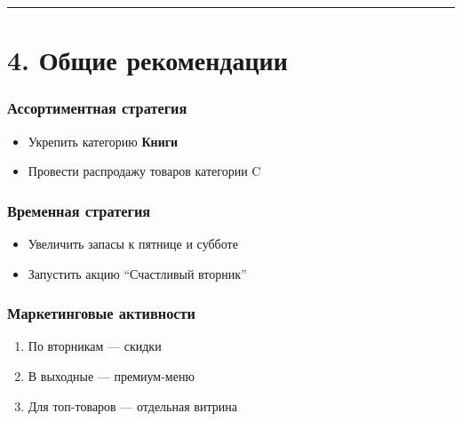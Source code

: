 \documentclass[
]{article}
\providecommand{\tightlist}{%
  \setlength{\itemsep}{0pt}\setlength{\parskip}{0pt}}
\begin{document}
\begin{center}\rule{0.5\linewidth}{0.5pt}\end{center}

\section{4. Общие
рекомендации}\label{ux43eux431ux449ux438ux435-ux440ux435ux43aux43eux43cux435ux43dux434ux430ux446ux438ux438}

\subsubsection{Ассортиментная
стратегия}\label{ux430ux441ux441ux43eux440ux442ux438ux43cux435ux43dux442ux43dux430ux44f-ux441ux442ux440ux430ux442ux435ux433ux438ux44f}

\begin{itemize}
\tightlist
\item
  Укрепить категорию \textbf{Книги}
\item
  Провести распродажу товаров категории C
\end{itemize}

\subsubsection{Временная
стратегия}\label{ux432ux440ux435ux43cux435ux43dux43dux430ux44f-ux441ux442ux440ux430ux442ux435ux433ux438ux44f}

\begin{itemize}
\tightlist
\item
  Увеличить запасы к пятнице и субботе
\item
  Запустить акцию ``Счастливый вторник''
\end{itemize}

\subsubsection{Маркетинговые
активности}\label{ux43cux430ux440ux43aux435ux442ux438ux43dux433ux43eux432ux44bux435-ux430ux43aux442ux438ux432ux43dux43eux441ux442ux438}

\begin{enumerate}
\def\labelenumi{\arabic{enumi}.}
\tightlist
\item
  По вторникам --- скидки
\item
  В выходные --- премиум-меню
\item
  Для топ-товаров --- отдельная витрина
\end{enumerate}
\end{document}
